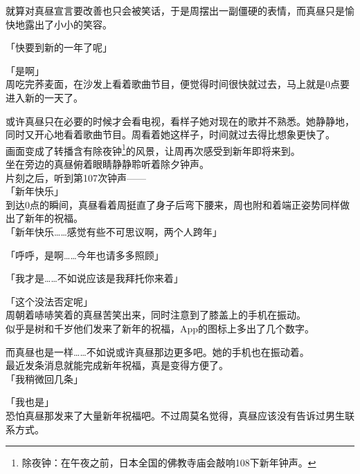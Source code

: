 就算对真昼宣言要改善也只会被笑话，于是周摆出一副僵硬的表情，而真昼只是愉快地露出了小小的笑容。\\

\vspace{2\baselineskip}

「快要到新的一年了呢」

「是啊」\\

周吃完荞麦面，在沙发上看着歌曲节目，便觉得时间很快就过去，马上就是0点要进入新的一天了。

或许真昼只在必要的时候才会看电视，看样子她对现在的歌并不熟悉。她静静地，同时又开心地看着歌曲节目。周看着她这样子，时间就过去得比想象更快了。\\

画面变成了转播含有除夜钟\footnote{除夜钟：在午夜之前，日本全国的佛教寺庙会敲响108下新年钟声。}的风景，让周再次感受到新年即将来到。\\

坐在旁边的真昼俯着眼睛静静聆听着除夕钟声。\\

片刻之后，听到第107次钟声——\\

「新年快乐」\\

到达0点的瞬间，真昼看着周挺直了身子后弯下腰来，周也附和着端正姿势同样做出了新年的祝福。\\

「新年快乐……感觉有些不可思议啊，两个人跨年」

「呼呼，是啊……今年也请多多照顾」

「我才是……不如说应该是我拜托你来着」

「这个没法否定呢」\\

周朝着哧哧笑着的真昼苦笑出来，同时注意到了膝盖上的手机在振动。\\

似乎是树和千岁他们发来了新年的祝福，App的图标上多出了几个数字。

而真昼也是一样……不如说或许真昼那边更多吧。她的手机也在振动着。\\

最近发条消息就能完成新年祝福，真是变得方便了。\\

「我稍微回几条」

「我也是」\\

恐怕真昼那发来了大量新年祝福吧。不过周莫名觉得，真昼应该没有告诉过男生联系方式。\\

